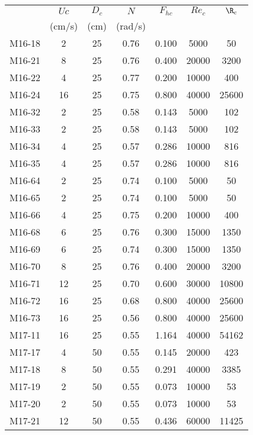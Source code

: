 
\begin{table}
\centering
\begin{tabular}{lcccccc}
    \toprule
    &   $Uc$ &  $D_c$ &  $N$  &  $F_{hc}$ &  $Re_c$ &   $\R_c$  \\
    & (cm/s) &   (cm) &(rad/s)&           &         &           \\
    \midrule

 M16-18 &   2 &  25 &  0.76 &  0.100 &   5000 &     50 \\
 M16-21 &   8 &  25 &  0.76 &  0.400 &  20000 &   3200 \\
 M16-22 &   4 &  25 &  0.77 &  0.200 &  10000 &    400 \\
 M16-24 &  16 &  25 &  0.75 &  0.800 &  40000 &  25600 \\
 M16-32 &   2 &  25 &  0.58 &  0.143 &   5000 &    102 \\
 M16-33 &   2 &  25 &  0.58 &  0.143 &   5000 &    102 \\
 M16-34 &   4 &  25 &  0.57 &  0.286 &  10000 &    816 \\
 M16-35 &   4 &  25 &  0.57 &  0.286 &  10000 &    816 \\
 M16-64 &   2 &  25 &  0.74 &  0.100 &   5000 &     50 \\
 M16-65 &   2 &  25 &  0.74 &  0.100 &   5000 &     50 \\
 M16-66 &   4 &  25 &  0.75 &  0.200 &  10000 &    400 \\
 M16-68 &   6 &  25 &  0.76 &  0.300 &  15000 &   1350 \\
 M16-69 &   6 &  25 &  0.74 &  0.300 &  15000 &   1350 \\
 M16-70 &   8 &  25 &  0.76 &  0.400 &  20000 &   3200 \\
 M16-71 &  12 &  25 &  0.70 &  0.600 &  30000 &  10800 \\
 M16-72 &  16 &  25 &  0.68 &  0.800 &  40000 &  25600 \\
 M16-73 &  16 &  25 &  0.56 &  0.800 &  40000 &  25600 \\
 M17-11 &  16 &  25 &  0.55 &  1.164 &  40000 &  54162 \\
 M17-17 &   4 &  50 &  0.55 &  0.145 &  20000 &    423 \\
 M17-18 &   8 &  50 &  0.55 &  0.291 &  40000 &   3385 \\
 M17-19 &   2 &  50 &  0.55 &  0.073 &  10000 &     53 \\
 M17-20 &   2 &  50 &  0.55 &  0.073 &  10000 &     53 \\
 M17-21 &  12 &  50 &  0.55 &  0.436 &  60000 &  11425 \\

\end{tabular}
\end{table}
